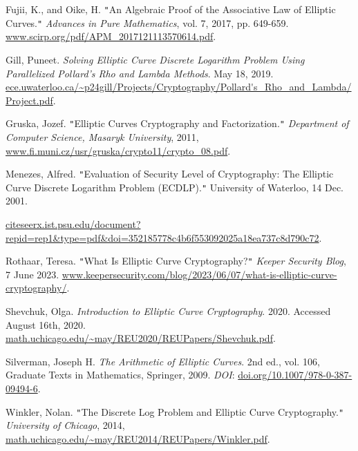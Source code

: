 \documentclass[11pt]{article}
\begin{document}
\begin{thebibliography}{9}

Fujii, K., and Oike, H. \texttt{"}An Algebraic Proof of the Associative Law of Elliptic Curves.\texttt{"} \textit{Advances in Pure Mathematics}, vol. 7, 2017, pp. 649-659. \url{www.scirp.org/pdf/APM_2017121113570614.pdf}.

Gill, Puneet. \textit{Solving Elliptic Curve Discrete Logarithm Problem Using Parallelized Pollard’s Rho and Lambda Methods}. May 18, 2019. \url{ece.uwaterloo.ca/~p24gill/Projects/Cryptography/Pollard's_Rho_and_Lambda/Project.pdf}.

Gruska, Jozef. \texttt{"}Elliptic Curves Cryptography and Factorization.\texttt{"} \textit{Department of Computer Science, Masaryk University}, 2011, \url{www.fi.muni.cz/usr/gruska/crypto11/crypto_08.pdf}.

Menezes, Alfred. \texttt{"}Evaluation of Security Level of Cryptography: The Elliptic Curve Discrete Logarithm Problem (ECDLP).\texttt{"} University of Waterloo, 14 Dec. 2001. 
\raggedright
\url{citeseerx.ist.psu.edu/document?repid=rep1&type=pdf&doi=352185778c4b6f553092025a18ea737c8d790c72}.
\par

Rothaar, Teresa. \texttt{"}What Is Elliptic Curve Cryptography?\texttt{"} \textit{Keeper Security Blog}, 7 June 2023. \url{www.keepersecurity.com/blog/2023/06/07/what-is-elliptic-curve-cryptography/}.

Shevchuk, Olga. \textit{Introduction to Elliptic Curve Cryptography}. 2020. Accessed August 16th, 2020. \url{math.uchicago.edu/~may/REU2020/REUPapers/Shevchuk.pdf}.

Silverman, Joseph H. \textit{The Arithmetic of Elliptic Curves}. 2nd ed., vol. 106, Graduate Texts in Mathematics, Springer, 2009. \textit{DOI}: \url{doi.org/10.1007/978-0-387-09494-6}.

Winkler, Nolan. \texttt{"}The Discrete Log Problem and Elliptic Curve Cryptography.\texttt{"} \textit{University of Chicago}, 2014, \url{math.uchicago.edu/~may/REU2014/REUPapers/Winkler.pdf}.

\end{thebibliography}
\end{document}
